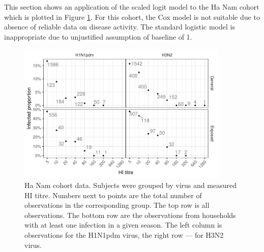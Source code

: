 This section shows an application of the scaled logit model to the Ha Nam cohort which is plotted in Figure \ref{HanamCounts}. For this cohort, the Cox model is not suitable due to absence of reliable data on disease activity. The standard logistic model is inappropriate due to unjustified assumption of baseline of 1.

\begin{figure}[htp]
	\centering
	\includegraphics[width=0.9\textwidth]{../data-plot/hanam-hi-summ-light.pdf}
	\caption{
	Ha Nam cohort data. Subjects were grouped by virus and measured HI titre. Numbers next to points are the total number of observations in the corresponding group. The top row is all observations. The bottom row are the observations from households with at least one infection in a given season. The left column is observations for the H1N1pdm virus, the right row --- for H3N2 virus.
	}
	\label{HanamCounts}
\end{figure}
